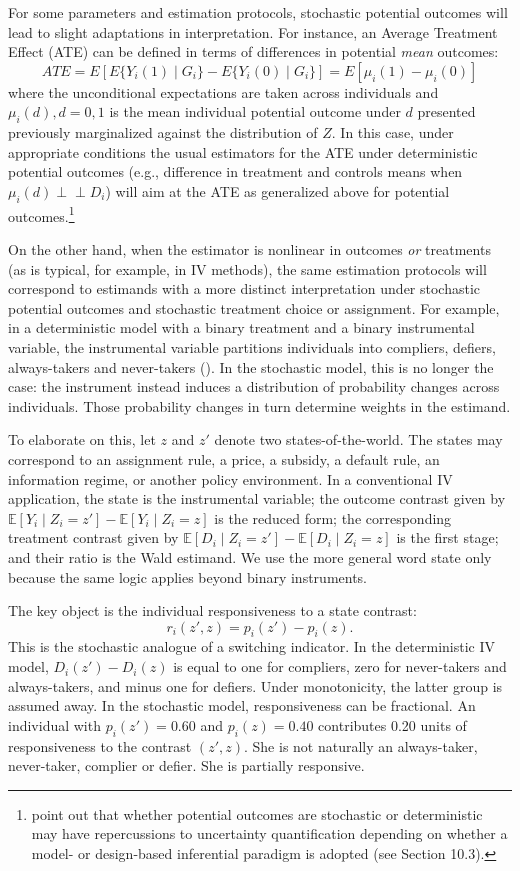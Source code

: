 \documentclass[11pt]{article}
\newcommand{\E}{\mathbb{E}}
\newcommand{\1}{\mathbf{1}}
\newcommand{\Perp}{\perp \!\!\! \perp}
\begin{document}
For some parameters and estimation protocols, stochastic potential outcomes will lead to slight adaptations in interpretation.  For instance, an Average Treatment Effect (ATE) can be defined in terms of differences in potential \emph{mean} outcomes:
\[
        ATE = E[E\{Y_i(1)\mid G_i\} - E\{Y_i(0) \mid G_i\}] = E[\mu_i(1) - \mu_i(0)]
\]
where the unconditional expectations are taken across individuals and $\mu_i(d), d=0,1$ is the mean individual potential outcome under $d$ presented previously marginalized against the distribution of $Z$.  In this case, under appropriate conditions the usual estimators for the ATE under deterministic potential outcomes (e.g., difference in treatment and controls means when $\mu_i(d) \Perp D_i$) will aim at the ATE as generalized above for potential outcomes.\footnote{\cite{hernanrobins2025} point out that whether potential outcomes are stochastic or deterministic may have repercussions to uncertainty quantification depending on whether a model- or design-based inferential paradigm is adopted (see Section 10.3).} 

On the other hand, when the estimator is nonlinear in outcomes \emph{or} treatments (as is typical, for example, in IV methods), the same estimation protocols will correspond to estimands with a more distinct interpretation under stochastic potential outcomes and stochastic treatment choice or assignment. For example, in a deterministic model with a binary treatment and a binary instrumental variable, the instrumental variable partitions individuals into compliers, defiers, always-takers and never-takers (\cite{angristimbensrubin1996}). In the stochastic model, this is no longer the case: the instrument instead induces a distribution of probability changes across individuals. Those probability changes in turn determine weights in the estimand.

To elaborate on this, let $z$ and $z'$ denote two states-of-the-world. The states may correspond to an assignment rule, a price, a subsidy, a default rule, an information regime, or another policy environment. In a conventional IV application, the state is the instrumental variable; the outcome contrast given by $\E[Y_i\mid Z_i=z']-\E[Y_i\mid Z_i=z]$ is the reduced form; the corresponding treatment contrast given by $\E[D_i\mid Z_i=z']-\E[D_i\mid Z_i=z]$ is the first stage; and their ratio is the Wald estimand. We use the more general word state only because the same logic applies beyond binary instruments.

The key object is the individual responsiveness to a state contrast:
\[
        r_i(z',z)=p_i(z')-p_i(z).
\]
This is the stochastic analogue of a switching indicator. In the deterministic IV model, $D_i(z')-D_i(z)$ is equal to one for compliers, zero for never-takers and always-takers, and minus one for defiers.  Under monotonicity, the latter group is assumed away. In the stochastic model, responsiveness can be fractional. An individual with $p_i(z')=0.60$ and $p_i(z)=0.40$ contributes 0.20 units of responsiveness to the contrast $(z',z)$. She is not naturally an always-taker, never-taker, complier or defier. She is partially responsive.
\end{document}
